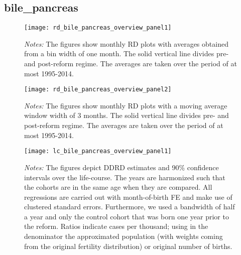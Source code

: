 \subsection{bile\_pancreas}
\begin{landscape}
\begin{figure}[H]
	\centering
	\begin{minipage}{.95\linewidth}
	\texttt{[image: rd\_bile\_pancreas\_overview\_panel1]}
	{\scriptsize \emph{Notes:} The figures show monthly RD plots with averages obtained from a bin width of one month. The solid vertical line divides pre- and post-reform regime. The averages are taken over the period of at most 1995-2014. \par}
\end{minipage}
\end{figure}
\end{landscape}
\begin{landscape}
\begin{figure}[H]
	\centering
\begin{minipage}{.95\linewidth}
	\texttt{[image: rd\_bile\_pancreas\_overview\_panel2]}
	{\scriptsize \emph{Notes:} The figures show monthly RD plots with a moving average window width of 3 months. The solid vertical line divides pre- and post-reform regime. The averages are taken over the period of at most 1995-2014. \par}
\end{minipage}
\end{figure}
\end{landscape}


\begin{landscape}
\begin{figure}[H]
\centering
\begin{minipage}{.9\linewidth}
\texttt{[image: lc\_bile\_pancreas\_overview\_panel1]}
{\scriptsize \emph{Notes:} The figures depict DDRD estimates and 90\% confidence intervals over the life-course. The years are harmonized such that the cohorts are in the same age when they are compared. All regressions are carried out with month-of-birth FE and make use of clustered standard errors. Furthermore, we used a bandwidth of half a year and only the control cohort that was born one year prior to the reform. Ratios indicate cases per thousand; using in the denominator the approximated population (with weights coming from the original fertility distribution) or original number of births. \par}
\end{minipage}
\end{figure}
\end{landscape}
